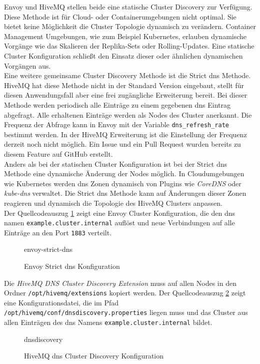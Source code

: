 Envoy und HiveMQ stellen beide eine statische Cluster Discovery zur Verfügung. Diese Methode ist für Cloud- oder Containerumgebungen nicht optimal. Sie bietet keine Möglichkeit die Cluster Topologie dynamisch zu verändern. Container Management Umgebungen, wie zum Beispiel Kubernetes, erlauben dynamische Vorgänge wie das Skalieren der Replika-Sets oder Rolling-Updates. Eine statische Cluster Konfiguration schlie{\ss}t den Einsatz dieser oder ähnlichen dynamischen Vorgängen aus.\\
Eine weitere gemeinsame Cluster Discovery Methode ist die Strict \ac{dns} Methode. HiveMQ hat diese Methode nicht in der Standard Version eingebaut, stellt für diesen Anwendungsfall aber eine frei zugängliche Erweiterung bereit.
Bei dieser Methode werden periodisch alle Einträge zu einem gegebenen \ac{dns} Eintrag abgefragt. Alle erhaltenen Einträge werden als Nodes des Cluster anerkannt. Die Frequenz der Abfrage kann in Envoy mit der Variable \verb|dns_refresh_rate| bestimmt werden. In der HiveMQ Erweiterung ist die Einstellung der Frequenz derzeit noch nicht möglich. Ein Issue \cite{AllowConfigurationDiscovery} und ein Pull Request \cite{ExponentialBackoffGeneral} wurden bereits zu diesem Feature auf GitHub erstellt.
\\
Anders als bei der statischen Cluster Konfiguration ist bei der Strict \ac{dns} Methode eine dynamische Änderung der Nodes möglich. In Cloudumgebungen wie Kubernetes werden \ac{dns} Zonen dynamisch von Plugins wie \textit{CoreDNS} oder \textit{kube-dns} verwaltet.\cite{DNSServicesPods}
Die Strict \ac{dns} Methode kann auf Änderungen dieser Zonen reagieren und dynamisch die Topologie des HiveMQ Clusters anpassen.
\\
Der Quellcodeauszug \ref{code:envoy-strict-dns} zeigt eine Envoy Cluster Konfiguration, die den \ac{dns} namen \verb|example.cluster.internal| auflöst und neue Verbindungen auf alle Einträge an den Port \verb|1883| verteilt.
\begin{figure}
    {envoy-strict-dns}
    \caption{Envoy Strict \ac{dns} Konfiguration}
    \label{code:envoy-strict-dns}
\end{figure}
Die \textit{HiveMQ DNS Cluster Discovery Extension} \cite{HiveMQExtensionDNS} muss auf allen Nodes in den Ordner \verb|/opt/hivemq/extensions| kopiert werden. Der Quellcodeauszug \ref{code:hivemq-dnsdiscovery} zeigt eine Konfigurationsdatei, die im Pfad \verb|/opt/hivemq/conf/dnsdiscovery.properties| liegen muss und das Cluster aus allen Einträgen des \ac{dns} Namens \verb|example.cluster.internal| bildet.
\begin{figure}
    {dnsdiscovery}
    \caption{HiveMQ \ac{dns} Cluster Discovery Konfiguration}
    \label{code:hivemq-dnsdiscovery}
\end{figure}

